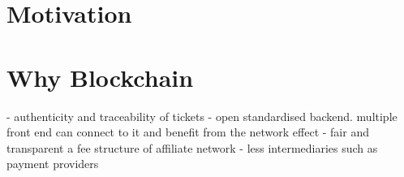 \section{Motivation}


\section{Why Blockchain}

- authenticity and traceability of tickets
- open standardised backend. multiple front end can connect to it and benefit from the network effect
- fair and transparent a fee structure of affiliate network
- less intermediaries such as payment providers 